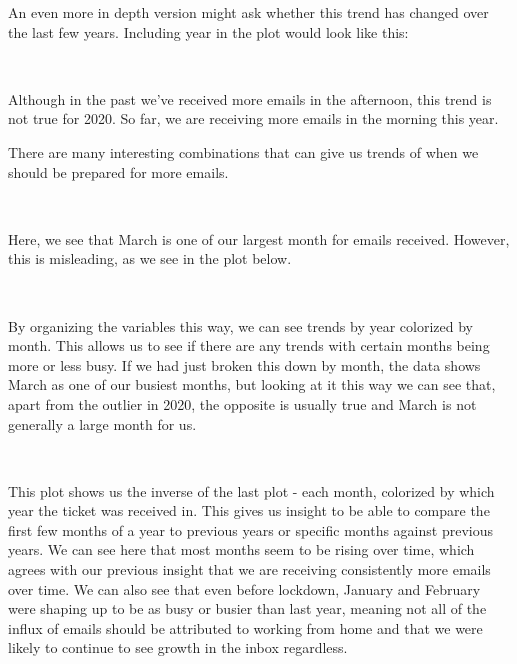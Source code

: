 \documentclass[11pt]{article}
\begin{document}
    An even more in depth version might ask whether this trend has changed
over the last few years. Including year in the plot would look like
this:

    \begin{center}
    \end{center}
    { \hspace*{\fill} \\}
    
    Although in the past we've received more emails in the afternoon, this
trend is not true for 2020. So far, we are receiving more emails in the
morning this year.

There are many interesting combinations that can give us trends of when
we should be prepared for more emails.

    \begin{center}
    \end{center}
    { \hspace*{\fill} \\}
    
    Here, we see that March is one of our largest month for emails received.
However, this is misleading, as we see in the plot below.

    \begin{center}
    \end{center}
    { \hspace*{\fill} \\}
    
    By organizing the variables this way, we can see trends by year
colorized by month. This allows us to see if there are any trends with
certain months being more or less busy. If we had just broken this down
by month, the data shows March as one of our busiest months, but looking
at it this way we can see that, apart from the outlier in 2020, the
opposite is usually true and March is not generally a large month for
us.

    \begin{center}
    \end{center}
    { \hspace*{\fill} \\}
    
    This plot shows us the inverse of the last plot - each month, colorized
by which year the ticket was received in. This gives us insight to be
able to compare the first few months of a year to previous years or
specific months against previous years. We can see here that most months
seem to be rising over time, which agrees with our previous insight that
we are receiving consistently more emails over time. We can also see that even before
lockdown, January and February were shaping up to be as busy or busier
than last year, meaning not all of the influx of emails should be
attributed to working from home and that we were likely to continue to
see growth in the inbox regardless.
\end{document}
